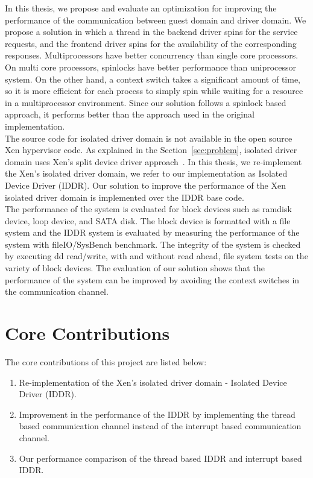 In this thesis, we propose and evaluate an optimization for improving the performance of the communication between guest domain and driver domain. We propose a solution in which a thread in the backend driver spins for the service requests, and the frontend driver spins for the availability of the corresponding responses. Multiprocessors have better concurrency than single core processors. On multi core processors, spinlocks have better performance than uniprocessor system. On the other hand, a context switch takes a significant amount of time, so it is more efficient for each process to simply spin while waiting for a resource in a multiprocessor environment. Since our solution follows a spinlock based approach, it performs better than the approach used in the original implementation.
\\[3mm]
The source code for isolated driver domain is not available in the open source Xen hypervisor code. As explained in the Section~\ref{sec:problem}, isolated driver domain uses Xen's split device driver approach~\cite{Fraser04safehardware}. In this thesis, we re-implement the Xen's isolated driver domain, we refer to our implementation as Isolated Device Driver (IDDR). Our solution to improve the performance of the Xen isolated driver domain is implemented over the IDDR base code.
\\[3mm]
The performance of the system is evaluated for block devices such as ramdisk device, loop device, and SATA disk. The block device is formatted with a file system and the IDDR system is evaluated by measuring the performance of the system with fileIO/SysBench benchmark. The integrity of the system is checked by executing dd read/write, with and without read ahead, file system tests on the variety of block devices. The evaluation of our solution shows that the performance of the system can be improved by avoiding the context switches in the communication channel. 
\pagebreak
\section{Core Contributions}
The core contributions of this project are listed below: 
\begin{enumerate}
\item Re-implementation of the Xen's isolated driver domain - Isolated Device Driver (IDDR).
\item Improvement in the performance of the IDDR by implementing the thread based communication channel instead of the interrupt based communication channel. 
\item Our performance comparison of the thread based IDDR and interrupt based IDDR.
\end{enumerate}
